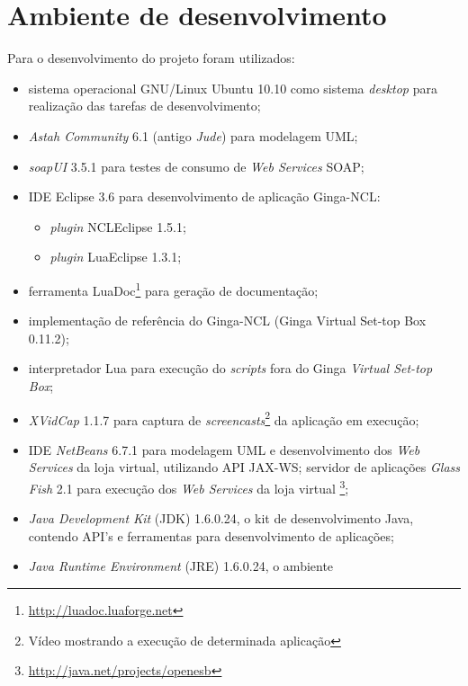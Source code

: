 \section{Ambiente de desenvolvimento} \label{sec:dev-env}

Para o desenvolvimento do projeto foram utilizados:

\begin{itemize}
	\item sistema operacional GNU/Linux Ubuntu 10.10 como sistema \textit{desktop} para realização das tarefas de desenvolvimento;
	\item \textit{Astah Community} 6.1 (antigo \textit{Jude}) para modelagem UML;
  \item \textit{soapUI} 3.5.1 para testes de consumo de \textit{Web Services} SOAP;
	\item IDE Eclipse 3.6 para desenvolvimento de aplicação Ginga-NCL:
	\begin{itemize}
		\item \textit{plugin} NCLEclipse 1.5.1;
		\item \textit{plugin} LuaEclipse 1.3.1;
	\end{itemize}
	\item ferramenta LuaDoc\footnote{\url{http://luadoc.luaforge.net}} para geração de documentação;
	\item implementação de referência do Ginga-NCL (Ginga Virtual Set-top Box 0.11.2);
	\item interpretador Lua para execução do \textit{scripts} fora do Ginga \textit{Virtual Set-top Box};	
	\item \textit{XVidCap} 1.1.7 para captura de \textit{screencasts}\footnote{Vídeo mostrando a execução de determinada aplicação} da aplicação em execução;
	\item IDE \textit{NetBeans} 6.7.1 para modelagem UML e desenvolvimento dos \textit{Web Services} da loja virtual, 
	utilizando API JAX-WS; servidor de aplicações \textit{Glass Fish} 2.1 para execução dos 
	\textit{Web Services} da loja virtual \footnote{\url{http://java.net/projects/openesb}};
	\item \textit{Java Development Kit} (JDK) 1.6.0.24, o kit de desenvolvimento
	Java, contendo API's e ferramentas para desenvolvimento de aplicações;
	\item \textit{Java Runtime Environment} (JRE) 1.6.0.24, o ambiente

\end{itemize}
